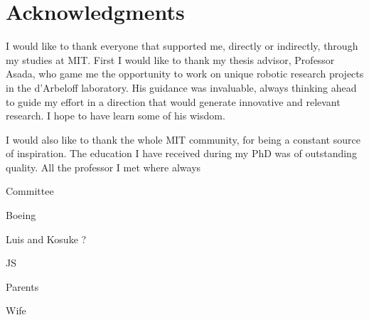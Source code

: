 \section*{Acknowledgments}

I would like to thank everyone that supported me, directly or indirectly, through my studies at MIT. First I would like to thank my thesis advisor, Professor Asada, who game me the opportunity to work on unique robotic research projects in the d'Arbeloff laboratory. His guidance was invaluable, always thinking ahead to guide my effort in a direction that would generate innovative and relevant research. I hope to have learn some of his wisdom. 

I would also like to thank the whole MIT community, for being a constant source of inspiration. The education I have received during my PhD was of outstanding quality. All the professor I met where always 

Committee

Boeing

Luis and Kosuke ?

JS

Parents

Wife